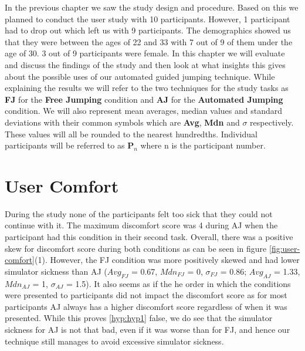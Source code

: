 \label{Chapter:Evaluation of the User Study}
In the previous chapter we saw the study design and procedure. Based on this we planned to conduct the user study with 10 participants. However, 1 participant had to drop out which left us with 9 participants. The demographics showed us that they were between the ages of 22 and 33 with 7 out of 9 of them under the age of 30. 3 out of 9 participants were female. In this chapter we will evaluate and discuss the findings of the study and then look at what insights this gives about the possible uses of our automated guided jumping technique. While explaining the results we will refer to the two techniques for the study tasks as \textbf{FJ} for the \textbf{Free Jumping} condition and \textbf{AJ} for the \textbf{Automated Jumping} condition. We will also represent mean averages, median values and standard deviations with their common symbols which are \textbf{Avg}, \textbf{Mdn} and \textbf{$\sigma$} respectively. These values will all be rounded to the nearest hundredths. Individual participants will be referred to as \textbf{P}$_n$ where n is the participant number.

\section{User Comfort}
\label{subsection EUS: User Comfort}
During the study none of the participants felt too sick that they could not continue with it. The maximum discomfort score was 4 during AJ when the participant had this condition in their second task. Overall, there was a positive skew for discomfort score during both conditions as can be seen in figure \ref{fig:user-comfort}(1). However, the FJ condition was more positively skewed and had lower simulator sickness than AJ ($Avg_{FJ}$ = 0.67, $Mdn_{FJ}$ = 0, $\sigma_{FJ}$ = 0.86; $Avg_{AJ}$ = 1.33, $Mdn_{AJ}$ = 1, $\sigma_{AJ}$ = 1.5). It also seems as if the he order in which the conditions were presented to participants did not impact the discomfort score as for most participants AJ always has a higher discomfort score regardless of when it was presented. While this proves \cref{hyp:hyp1} false, we do see that the simulator sickness for AJ is not that bad, even if it was worse than for FJ, and hence our technique still manages to avoid excessive simulator sickness.

